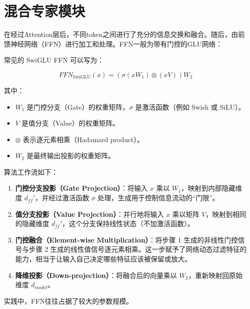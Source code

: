 \setcounter{section}{4}

\hypertarget{ux6df7ux5408ux4e13ux5bb6ux6a21ux5757}{%
\section{混合专家模块}\label{ux6df7ux5408ux4e13ux5bb6ux6a21ux5757}}

在经过Attention层后，不同token之间进行了充分的信息交换和融合。随后，由前馈神经网络（FFN）进行加工和处理。FFN一般为带有门控的GLU网络：

常见的 SwiGLU FFN 可以写为：

\[
FFN_{\mathrm{SwiGLU}}(x) = (\sigma(xW_1) \otimes (xV))W_2
\]

其中：

\begin{itemize}
\tightlist
\item
  \(W_1\) 是门控分支（Gate）的权重矩阵，\(\sigma\) 是激活函数（例如 Swish 或 SiLU）。
\item
  \(V\) 是值分支（Value）的权重矩阵。
\item
  \(\otimes\) 表示逐元素相乘（Hadamard product）。
\item
  \(W_2\) 是最终输出投影的权重矩阵。
\end{itemize}

算法工作流如下：

\begin{enumerate}
\def\labelenumi{\arabic{enumi}.}
\tightlist
\item
  \textbf{门控分支投影（Gate Projection）}：将输入 \(x\) 乘以 \(W_1\)，映射到内部隐藏维度 \(d_{ff}'\)，并经过激活函数 \(\sigma\) 处理，生成用于控制信息流动的``门限''。
\item
  \textbf{值分支投影（Value Projection）}：并行地将输入 \(x\) 乘以矩阵 \(V\)，映射到相同的隐藏维度 \(d_{ff}'\)，这个分支保持线性状态（不加激活函数）。
\item
  \textbf{门控融合（Element-wise Multiplication）}：将步骤 1 生成的非线性门控信号与步骤 2 生成的线性值信号逐元素相乘。这一步赋予了网络动态过滤特征的能力，相当于让输入自己决定哪些特征应该被保留或放大。
\item
  \textbf{降维投影（Down-projection）}：将融合后的向量乘以 \(W_2\)，重新映射回原始维度 \(d_{model}\)。
\end{enumerate}

实践中，FFN往往占据了较大的参数规模。


